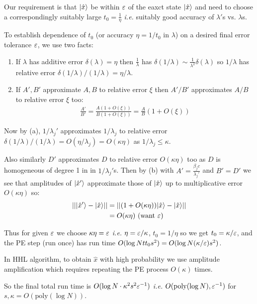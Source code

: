 \documentclass[]{article}
\renewcommand{\it}[1]{\textit{#1}}
\newcommand{\poly}{\textrm{poly}}
\begin{document}
\begin{remark*}
\begin{itemize}
		Our requirement is that $\lvert\hat{x}\rangle$ be within $\varepsilon$ of the eaxct state $\lvert\hat{x}\rangle$ and need to choose a correspondingly suitably large $t_0 = \frac{1}{\eta}$ \it{i.e.} suitably good accuracy of $\lambda'$s vs. $\lambda$s.

		To establish dependence of $t_0$ (or accuracy $\eta = 1/t_0$ in $\lambda$) on a desired final error tolerance $\varepsilon$, we use two facts:

		\begin{enumerate}[label = (\alph*)]
			\item If $\lambda$ has additive error $\delta(\lambda) = \eta$ then $\frac{1}{\lambda}$ has $\delta(1/\lambda) \sim \frac{1}{\lambda^2}\delta(\lambda)$ so $1/\lambda$ has relative error $\delta(1/\lambda)/(1/\lambda) = \eta/\lambda$.
			
			\item If $A',B'$ approximate $A,B$ to relative error $\xi$ then $A'/B'$ approximates $A/B$ to relative error $\xi$ too:
			\begin{align*}
				\frac{A'}{B'} = \frac{A(1 + O(\xi))}{B(1 + O(\xi))} = \frac{A}{B}(1 + O(\xi))
			\end{align*}
		\end{enumerate}
		Now by (a), $1/\lambda_j'$ approximates $1/\lambda_j$ to relative error $\delta(1/\lambda)/(1/\lambda) = O(\eta/\lambda_j) = O(\kappa\eta)$ as $1/\lambda_j \le \kappa$.

		Also similarly $D'$ approximates $D$ to relative error $O(\kappa\eta)$ too as $D$ is homogeneous of degree 1 in in $1/\lambda_j'$s. Then by (b) with $A' = \frac{\beta_j c}{\lambda_j'}$ and $B' = D'$ we see that amplitudes of $\lvert\hat{x}'\rangle$ approximate those of $\lvert\hat{x}\rangle$ up to multiplicative error $O(\kappa\eta)$ so:
		\begin{align*}
			||\lvert\hat{x}'\rangle - \lvert\hat{x}\rangle|| &= ||(1 + O(\kappa\eta))\lvert\hat{x}\rangle - \lvert\hat{x}\rangle||\\
			&= O(\kappa\eta) \textrm{ (want $\varepsilon$)}
		\end{align*}

		Thus for given $\varepsilon$ we choose $\kappa\eta = \varepsilon$ \it{i.e.} $\eta = \varepsilon/\kappa$, $t_0 = 1/\eta$ so we get $t_0 = \kappa/\varepsilon$, and the PE step (run once) has run time $O(\log N tt_0 s^2) = O(\log N (\kappa/\varepsilon)s^2)$.

		In HHL algorithm, to obtain $\hat{x}$ with high probability we use amplitude amplification which requires repeating the PE process $O(\kappa)$ times.

		So the final total run time is $O(\log N \cdot \kappa^2 s^2 \varepsilon^{-1})$ \it{i.e.} $O(\poly(\log N),\eps^{-1})$ for $s,\kappa = O(\poly(\log N))$.
	\end{itemize}
\end{remark*}
\end{document}
